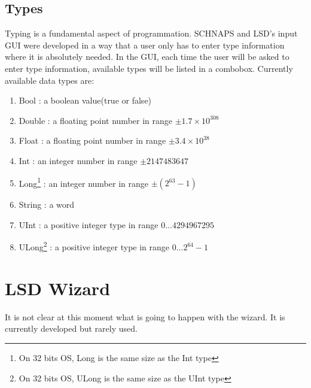 \documentclass[a4paper,11pt]{report}
\begin{document}
\section{Types}
Typing is a fundamental aspect of programmation. SCHNAPS and LSD's input GUI were developed in a way that a user only has to enter type information where it is absolutely needed. In the GUI, each time the user will be asked to enter type information, available types will be listed in a combobox. Currently available data types are:
\begin{enumerate}
\item{Bool :} a boolean value(true or false)
\item{Double :} a floating point number in range \begin{math}\pm1.7\times10^{308} \end{math}
\item{Float :} a floating point number in range \begin{math}\pm3.4\times10^{38} \end{math}
\item{Int :} an integer number in range \begin{math}\pm2147483647\end{math}
­\item{Long\footnote{On 32 bits OS, Long is the same size as the Int type} :} an integer number in range \begin{math}\pm(2^{63}-1)\end{math}
\item{String :} a word
\item{UInt :} a positive integer type in range \begin{math}0...4294967295\end{math}
\item{ULong\footnote{On 32 bits OS, ULong is the same size as the UInt type} :} a positive integer type in range \begin{math}0...2^{64}-1\end{math}
\end{enumerate}

\chapter{LSD Wizard}
\label{chap:wizard}
It is not clear at this moment what is going to happen with the wizard. It is currently developed but rarely used.
\end{document}

